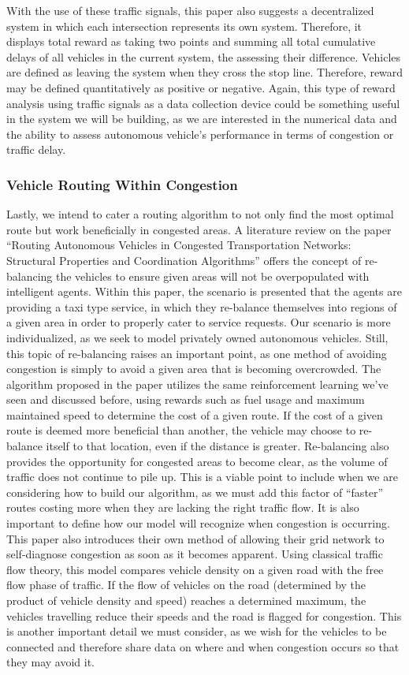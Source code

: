 \documentclass[onecolumn, draftclsnofoot,10pt, compsoc]{IEEEtran}
\begin{document}
With the use of these traffic signals, this paper also suggests a decentralized system in which each intersection represents its own system.
Therefore, it displays total reward as taking two points and summing all total cumulative delays of all vehicles in the current system, the assessing their difference.
Vehicles are defined as leaving the system when they cross the stop line.
Therefore, reward may be defined quantitatively as positive or negative.
Again, this type of reward analysis using traffic signals as a data collection device could be something useful in the system we will be building, as we are interested in the numerical data and the ability to assess autonomous vehicle’s performance in terms of congestion or traffic delay.
\subsubsection{Vehicle Routing Within Congestion}
Lastly, we intend to cater a routing algorithm to not only find the most optimal route but work beneficially in congested areas.
A literature review on the paper “Routing Autonomous Vehicles in Congested Transportation
Networks: Structural Properties and Coordination Algorithms”\cite{Routing:2016} offers the concept of re-balancing the vehicles to ensure given areas will not be overpopulated with intelligent agents.
Within this paper, the scenario is presented that the agents are providing a taxi type service, in which they re-balance themselves into regions of a given area in order to properly cater to service requests.
Our scenario is more individualized, as we seek to model privately owned autonomous vehicles.
Still, this topic of re-balancing raises an important point, as one method of avoiding congestion is simply to avoid a given area that is becoming overcrowded.
The algorithm proposed in the paper utilizes the same reinforcement learning we've seen and discussed before, using rewards such as fuel usage and maximum maintained speed to determine the cost of a given route.
If the cost of a given route is deemed more beneficial than another, the vehicle may choose to re-balance itself to that location, even if the distance is greater.
Re-balancing also provides the opportunity for congested areas to become clear, as the volume of traffic does not continue to pile up.
This is a viable point to include when we are considering how to build our algorithm, as we must add this factor of “faster” routes costing more when they are lacking the right traffic flow.
It is also important to define how our model will recognize when congestion is occurring.
This paper also introduces their own method of allowing their grid network to self-diagnose congestion as soon as it becomes apparent.
Using classical traffic flow theory, this model compares vehicle density on a given road with the free flow phase of traffic.
If the flow of vehicles on the road (determined by the product of vehicle density and speed) reaches a determined maximum, the vehicles travelling reduce their speeds and the road is flagged for congestion.
This is another important detail we must consider, as we wish for the vehicles to be connected and therefore share data on where and when congestion occurs so that they may avoid it.
\end{document}
